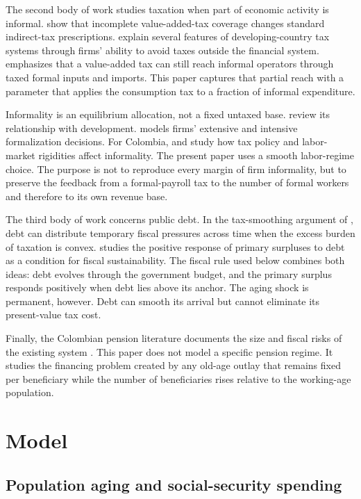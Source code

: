 \documentclass[12pt]{article}
\begin{document}
The second body of work studies taxation when part of economic activity is
informal. \citet{EmranStiglitz2005} show that incomplete value-added-tax
coverage changes standard indirect-tax prescriptions.
\citet{GordonLi2009} explain several features of developing-country tax
systems through firms' ability to avoid taxes outside the financial system.
\citet{Keen2007} emphasizes that a value-added tax can still reach informal
operators through taxed formal inputs and imports. This paper captures that
partial reach with a parameter that applies the consumption tax to a fraction
of informal expenditure.

Informality is an equilibrium allocation, not a fixed untaxed base.
\citet{LaPortaShleifer2014} review its relationship with development.
\citet{Ulyssea2018} models firms' extensive and intensive formalization
decisions. For Colombia, \citet{Osorio2016} and
\citet{GrandaMorales2023} study how tax policy and labor-market rigidities
affect informality. The present paper uses a smooth labor-regime choice. The
purpose is not to reproduce every margin of firm informality, but to preserve
the feedback from a formal-payroll tax to the number of formal workers and
therefore to its own revenue base.

The third body of work concerns public debt. In the tax-smoothing argument of
\citet{Barro1979}, debt can distribute temporary fiscal pressures across
time when the excess burden of taxation is convex. \citet{Bohn1998} studies
the positive response of primary surpluses to debt as a condition for fiscal
sustainability. The fiscal rule used below combines both ideas: debt evolves
through the government budget, and the primary surplus responds positively
when debt lies above its anchor. The aging shock is permanent, however. Debt
can smooth its arrival but cannot eliminate its present-value tax cost.

Finally, the Colombian pension literature documents the size and fiscal risks
of the existing system \citep{Ospina2024}. This paper does not model a
specific pension regime. It studies the financing problem created by any
old-age outlay that remains fixed per beneficiary while the number of
beneficiaries rises relative to the working-age population.

\section{Model}

\subsection{Population aging and social-security spending}
\end{document}
